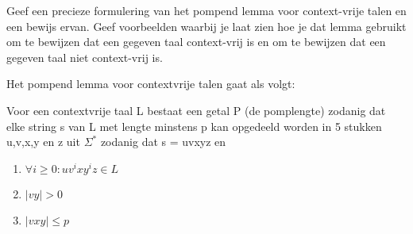 \begin{quest}[Vraag 8]
Geef een precieze formulering van het pompend lemma voor context-vrije talen en een bewijs ervan. Geef voorbeelden waarbij je laat zien hoe je dat lemma gebruikt om te bewijzen dat een gegeven taal context-vrij is en om te bewijzen dat een gegeven taal niet context-vrij is.
\end{quest}

Het pompend lemma voor contextvrije talen gaat als volgt:
\begin{theorem}
Voor een contextvrije taal L bestaat een getal P (de pomplengte) zodanig dat elke string s van L met lengte minstens p kan opgedeeld worden in 5 stukken u,v,x,y en z uit $\Sigma^*$ zodanig dat s = uvxyz en 
\begin{enumerate}
\item $\forall i \geq 0 : uv^ixy^iz \in L$
\item $|vy| > 0$
\item $|vxy| \leq p$
\end{enumerate}
\end{theorem}

